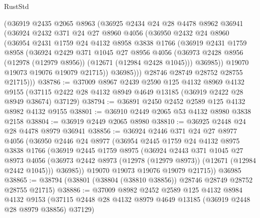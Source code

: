 \begin{lexlean}{RustStd}
\begin{coremodule}
          (@36919
            @2435
            @2065
            @8963
            (@36925
              @2434
              @24
              @28
              @4478
              @8962
              @36941
              (@36924
                @2432
                @371
                @24
                @27
                @8960
                @4056
                (@36950
                  @2432
                  @24
                  @8960
                  (@36954
                    @2431
                    @1759
                    @24
                    @4132
                    @8958
                    @3838
                    @1766
                    (@36919
                      @2431
                      @1759
                      @8958
                      (@36924
                        @2429
                        @371
                        @1045
                        @27
                        @8956
                        @4056
                        (@36973 @2428 @8956 (@12978 (@12979 @8956)) (@12671 (@12984 @2428 @1045)))
                        @36985))
                    @19070
                    @19073
                    @19076
                    @19079
                    @21715))
                @36985)))
          @28746
          @28749
          @28752
          @28755
          @21715)))
@38786 := @37009
    @8967
    @2439
    @2590
    @125
    @4132
    @8969
    @4132
    @9155
    (@37115 @2422 @28 @4132 @8949 @4649 @13185 (@36919 @2422 @28 @8949 @38674) @37129)
@38794 := @36891 @2450 @2452 @2589 @125 @4132 @8982 @4132 @9155
@38801 := @36910 @2449 @2065 @53 @4132 @8980 @3838 @2158
@38804 := @36919 @2449 @2065 @8980
@38810 := @36925 @2448 @24 @28 @4478 @8979 @36941
@38856 := @36924
    @2446
    @371
    @24
    @27
    @8977
    @4056
    (@36950
      @2446
      @24
      @8977
      (@36954
        @2445
        @1759
        @24
        @4132
        @8975
        @3838
        @1766
        (@36919
          @2445
          @1759
          @8975
          (@36924
            @2443
            @371
            @1045
            @27
            @8973
            @4056
            (@36973 @2442 @8973 (@12978 (@12979 @8973)) (@12671 (@12984 @2442 @1045)))
            @36985))
        @19070
        @19073
        @19076
        @19079
        @21715))
    @36985
@38865 := @38794 (@38801 (@38804 (@38810 @38856)) @28746 @28749 @28752 @28755 @21715)
@38886 := @37009
    @8982
    @2452
    @2589
    @125
    @4132
    @8984
    @4132
    @9153
    (@37115 @2448 @28 @4132 @8979 @4649 @13185 (@36919 @2448 @28 @8979 @38856) @37129)

\end{coremodule}
\end{lexlean}
